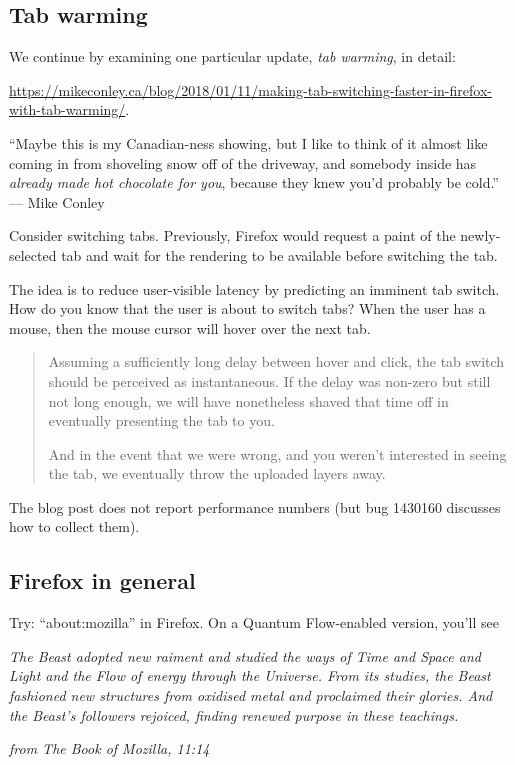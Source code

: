 \documentclass[a4paper]{report}
\begin{document}
\subsection*{Tab warming} We continue by examining one particular update, \emph{tab warming}, in detail:
\begin{center}
\scriptsize
\vspace*{-1em}
\url{https://mikeconley.ca/blog/2018/01/11/making-tab-switching-faster-in-firefox-with-tab-warming/}.
\end{center}
\vspace*{-1em}

\hfill ``Maybe this is my Canadian-ness showing, but I like to think of it almost like coming in from shoveling snow off of the driveway, and somebody inside has \emph{already made hot chocolate for you}, because they knew you’d probably be cold.'' --- Mike Conley

Consider switching tabs. Previously, Firefox would request a paint of the newly-selected tab and wait for the rendering to be available before switching the tab.

The idea is to reduce user-visible latency by predicting an imminent tab switch. How do you know that the user is about to switch tabs? When the user has a mouse, then the mouse cursor will hover over the next tab.

\begin{quote}
Assuming a sufficiently long delay between hover and click, the tab switch should be perceived as instantaneous. If the delay was non-zero but still not long enough, we will have nonetheless shaved that time off in eventually presenting the tab to you.

And in the event that we were wrong, and you weren’t interested in seeing the tab, we eventually throw the uploaded layers away.
\end{quote}

The blog post does not report performance numbers (but bug 1430160 discusses how to collect them).

\subsection*{Firefox in general}

Try: ``about:mozilla'' in Firefox. On a Quantum Flow-enabled version, you'll see

\begin{center}
\emph{The Beast adopted new raiment and studied the ways of Time and Space and Light and the Flow of energy through the Universe. From its studies, the Beast fashioned new structures from oxidised metal and proclaimed their glories. And the Beast’s followers rejoiced, finding renewed purpose in these teachings.}

\hfill \emph{from The Book of Mozilla, 11:14}
\end{center}
\end{document}
